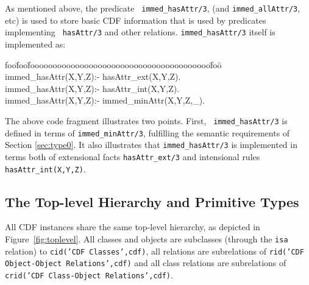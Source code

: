 As mentioned above, the predicate {\tt
immed\_hasAttr/3}, (and {\tt immed\_allAttr/3}, etc) is used to store
basic CDF information that is used by predicates implementing {\tt
hasAttr/3} and other relations.  {\tt immed\_hasAttr/3} itself is
implemented as:
%
{\small {\sf  
\begin{tabbing}
foo\=foo\=foooooooooooooooooooooooooooooooooooooooo\=foo\=\kill
%
\> immed\_hasAttr(X,Y,Z):- hasAttr\_ext(X,Y,Z). \\
\> immed\_hasAttr(X,Y,Z):- hasAttr\_int(X,Y,Z). \\
\> immed\_hasAttr(X,Y,Z):- immed\_minAttr(X,Y,Z,\_). 
\end{tabbing} } }
%
\noindent
The above code fragment illustrates two points.  First, {\tt
immed\_hasAttr/3} is defined in terms of {\tt immed\_minAttr/3},
fulfilling the semantic requirements of Section \ref{sec:type0}.
It also illustrates that {\tt immed\_hasAttr/3} is implemented in
terms both of extensional facts {\tt hasAttr\_ext/3} and intensional
rules {\tt hasAttr\_int(X,Y,Z)}.  


\subsection{The Top-level Hierarchy and Primitive Types}

All CDF instances share the same top-level hierarchy, as depicted in
Figure~\ref{fig:toplevel}.  All classes and objects are subclasses
(through the {\tt isa} relation) to {\tt cid('CDF Classes',cdf)}, all
relations are subrelations of {\tt rid('CDF Object-Object
Relations',cdf)} and all class relations are subrelations of {\tt
crid('CDF Class-Object Relations',cdf)}.

